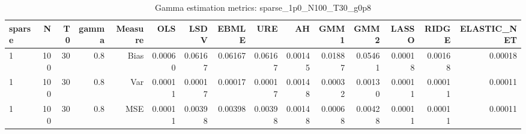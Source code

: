 \begin{table}[!htbp]\centering
\caption{Gamma estimation metrics: sparse_1p0_N100_T30_g0p8}
\label{tab:table1_sparse_1p0_N100_T30_g0p8}
\begin{tabular}{lrrrrrrrrrrrrrr}
\hline
sparse & N & T0 & gamma & Measure & OLS & LSDV & EBMLE & URE & AH & GMM1 & GMM2 & LASSO & RIDGE & ELASTIC_NET \\
\hline
1 & 100 & 30 & 0.8 & Bias & 0.00060 & 0.06167 & 0.06167 & 0.06167 & 0.00145 & 0.01887 & 0.05461 & 0.00018 & 0.00168 & 0.00018 \\
1 & 100 & 30 & 0.8 & Var & 0.00011 & 0.00017 & 0.00017 & 0.00017 & 0.00148 & 0.00032 & 0.00130 & 0.00011 & 0.00011 & 0.00011 \\
1 & 100 & 30 & 0.8 & MSE & 0.00011 & 0.00398 & 0.00398 & 0.00398 & 0.00148 & 0.00068 & 0.00428 & 0.00011 & 0.00011 & 0.00011 \\
\hline
\end{tabular}
\end{table}

